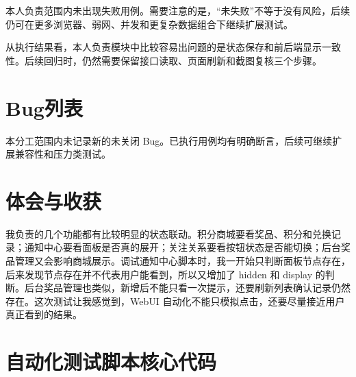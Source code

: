\documentclass[bwprint]{report}
\begin{document}
本人负责范围内未出现失败用例。需要注意的是，“未失败”不等于没有风险，后续仍可在更多浏览器、弱网、并发和更复杂数据组合下继续扩展测试。

从执行结果看，本人负责模块中比较容易出问题的是状态保存和前后端显示一致性。后续回归时，仍然需要保留接口读取、页面刷新和截图复核三个步骤。


\section{Bug列表}
本分工范围内未记录新的未关闭 Bug。已执行用例均有明确断言，后续可继续扩展兼容性和压力类测试。

\section{体会与收获}
我负责的几个功能都有比较明显的状态联动。积分商城要看奖品、积分和兑换记录；通知中心要看面板是否真的展开；关注关系要看按钮状态是否能切换；后台奖品管理又会影响商城展示。调试通知中心脚本时，我一开始只判断面板节点存在，后来发现节点存在并不代表用户能看到，所以又增加了 hidden 和 display 的判断。后台奖品管理也类似，新增后不能只看一次提示，还要刷新列表确认记录仍然存在。这次测试让我感觉到，WebUI 自动化不能只模拟点击，还要尽量接近用户真正看到的结果。

\appendix
\section{自动化测试脚本核心代码}
\end{document}

